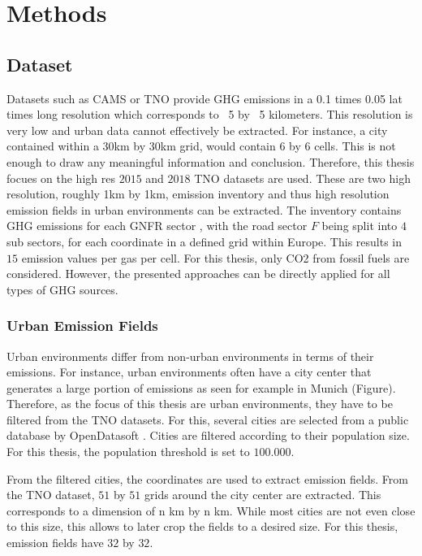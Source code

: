 
\chapter{Methods}\label{chapter:methods}

\section{Dataset}
Datasets such as CAMS \parencite{CAMS} or TNO \parencite{TNO_LowRes}  provide GHG emissions in a 0.1 times 0.05 lat times long resolution which corresponds to ~5 by ~5 kilometers.
This resolution is very low and urban data cannot effectively be extracted.
For instance, a city contained within a 30km by 30km grid, would contain 6 by 6 cells.
This is not enough to draw any meaningful information and conclusion. 
Therefore, this thesis focues on the high res $2015$ \parencite{TNO_HighRes15} and $2018$ \parencite{TNO_HighRes18} TNO datasets are used.
These are two high resolution, roughly 1km by 1km, emission inventory and thus high resolution emission fields in urban environments can be extracted.
The inventory contains GHG emissions for each GNFR sector \parencite{GNFR_Sectors}, with the road sector $F$ being split into $4$ sub sectors, for each coordinate in a defined grid within Europe.
This results in $15$ emission values per gas per cell.
For this thesis, only CO2 from fossil fuels are considered.
However, the presented approaches can be directly applied for all types of GHG sources.

\subsection{Urban Emission Fields}
Urban environments differ from non-urban environments in terms of their emissions.
For instance, urban environments often have a city center that generates a large portion of emissions as seen for example in Munich (Figure).
Therefore, as the focus of this thesis are urban environments, they have to be filtered from the TNO datasets.
For this, several cities are selected from a public database by OpenDatasoft \parencite{OpenDataSoft}.
Cities are filtered according to their population size.
For this thesis, the population threshold is set to $100.000$.

From the filtered cities, the coordinates are used to extract emission fields.
From the TNO dataset, $51$ by $51$ grids around the city center are extracted.
This corresponds to a dimension of n km by n km.
While most cities are not even close to this size, this allows to later crop the fields to a desired size.
For this thesis, emission fields have $32$ by $32$.

